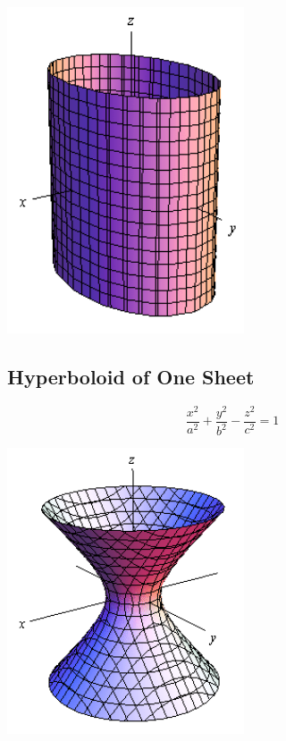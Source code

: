 \documentclass{article}
\begin{document}
\begin{center}
	\includegraphics*[width=7cm]{cylinder.png}
\end{center}


\subsection*{Hyperboloid of One Sheet}
\[ \frac{x^2}{a^2} + \frac{y^2}{b^2} - \frac{z^2}{c^2} = 1 \] 
\begin{center}
	\includegraphics*[width=7cm]{hyperboloid1.png}
\end{center}
\end{document}
